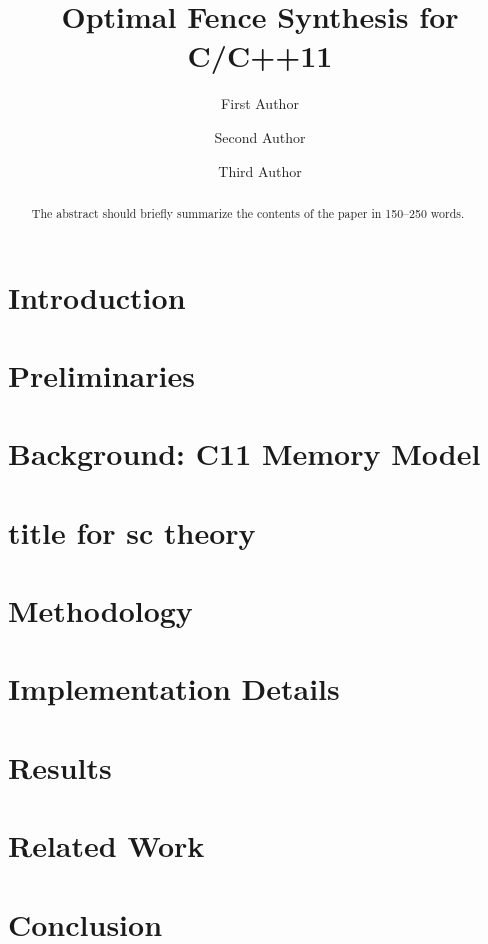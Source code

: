 \documentclass[runningheads]{llncs2e/llncs}
\begin{document}
%
\title{Optimal Fence Synthesis for C/C++11}
%
%
\author{First Author \and
Second Author \and
Third Author}
%
%
%
\maketitle              %
%
\begin{abstract}
The abstract should briefly summarize the contents of the paper in
150--250 words.

\end{abstract}
%
%
%
\section{Introduction} \label{sec:intro}

\section{Preliminaries} \label{sec:preliminaries}


\section{Background: C11 Memory Model} \label{sec:c11}



\section{title for sc theory} \label{sec:theory}
\section{Methodology} \label{sec:methodology}
\section{Implementation Details} \label{sec:implementation}
\section{Results} \label{sec:results}
\section{Related Work} \label{sec:related}
\section{Conclusion} \label{sec:conclusion}

%

\end{document}
